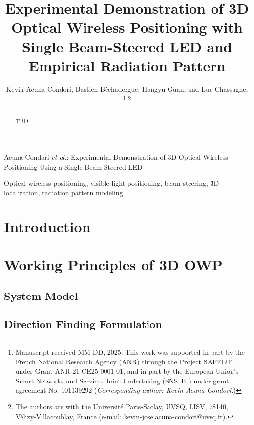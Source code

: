 \documentclass[journal]{IEEEtran}
\begin{document}

\title{Experimental Demonstration of 3D Optical Wireless Positioning with Single Beam-Steered LED and Empirical Radiation Pattern}
\author{
    Kevin Acuna-Condori,
    Bastien Béchadergue, 
    Hongyu Guan, and
    Luc Chassagne, 
    \thanks{Manuscript received MM DD, 2025.
    This work was supported in part by the French National Research Agency (ANR) through the Project SAFELiFi under Grant ANR-21-CE25-0001-01, and in part by the European Union's Smart Networks and Services Joint Undertaking (SNS JU) under grant agreement No. 101139292 (\textit{Corresponding author: Kevin Acuna-Condori.})
    }
    \thanks{The authors are with the Université Paris-Saclay, UVSQ, LISV, 78140, Vélizy-Villacoublay, France (e-mail: kevin-jose.acuna-condori@uvsq.fr).}
}
%
{Acuna-Condori \MakeLowercase{\textit{et al.}}: Experimental Demonstration of 3D Optical Wireless Positioning Using a Single Beam-Steered LED}
\maketitle

\begin{abstract}
TBD
\end{abstract}

\begin{IEEEkeywords}
Optical wireless positioning, visible light positioning, beam steering, 3D localization, radiation pattern modeling.
\end{IEEEkeywords}





\section{Introduction}

\section{Working Principles of 3D OWP}
    \subsection{System Model}
    \subsection{Direction Finding Formulation}
    
\end{document}
